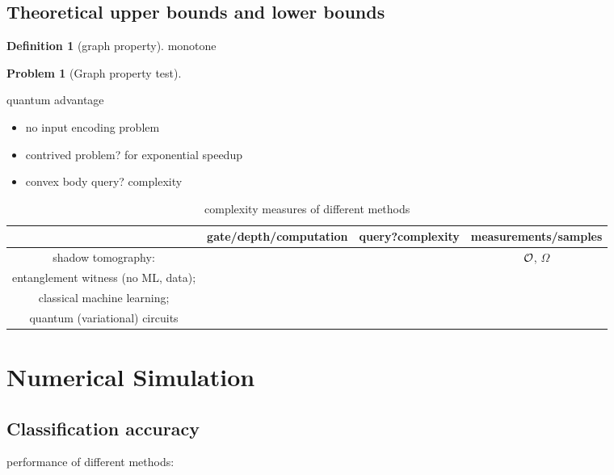 \documentclass[
aps,
pra,
linenumbers,
floatfix,
]{revtex4-2}
\theoremstyle{plain}
\theoremstyle{definition}
\newtheorem{definition}{Definition}
\newtheorem{problem}{Problem}
\begin{document}
\subsection{Theoretical upper bounds and lower bounds}
\begin{definition}[graph property]\label{def:graph_property}
	monotone
\end{definition}
\begin{problem}[Graph property test]
\end{problem}
quantum advantage
\begin{itemize}
	\item no input encoding problem \cite{tangQuantumPrincipalComponent2021}
	\item contrived problem? for exponential speedup
	\item convex body query? complexity
\end{itemize}
\begin{table}[!ht]
\centering
\begin{tabular}{c|c|c|c}
	& gate/depth/computation & query?complexity & measurements/samples \\  
	\hline
	shadow tomography:  & & & $\mathcal{O}$, $\Omega$ \\  
	entanglement witness (no ML, data); & & & \\  
	classical machine learning;  & & & \\  
	quantum (variational) circuits & & & \\  
	\hline
\end{tabular}
\caption{complexity measures of different methods}
\end{table}

\section{Numerical Simulation}
\subsection{Classification accuracy}
performance of different methods: 
\end{document}
